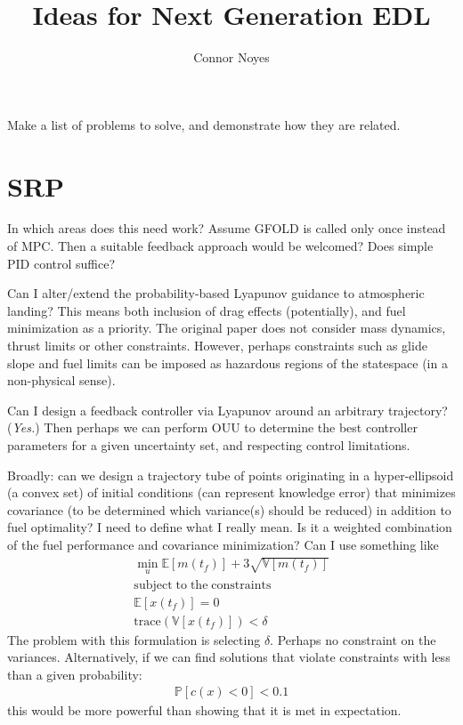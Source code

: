 \documentclass[10pt,a4paper]{article}
\author{Connor Noyes}
\title{Ideas for Next Generation EDL}
\begin{document}

	Make a list of problems to solve, and demonstrate how they are related.
	\section{SRP}
	In which areas does this need work? Assume GFOLD is called only once instead of MPC. Then a suitable feedback approach would be welcomed? Does simple PID control suffice?
	 
	Can I alter/extend the probability-based Lyapunov guidance to atmospheric landing? This means both inclusion of drag effects (potentially), and fuel minimization as a priority. The original paper does not consider mass dynamics, thrust limits or other constraints. However, perhaps constraints such as glide slope and fuel limits can be imposed as hazardous regions of the statespace (in a non-physical sense).
	
	Can I design a feedback controller via Lyapunov around an arbitrary trajectory? (\textit{Yes.}) Then perhaps we can perform OUU to determine the best controller parameters for a given uncertainty set, and respecting control limitations.
	
	Broadly: can we design a trajectory tube of points originating in a hyper-ellipsoid (a convex set) of initial conditions (can represent knowledge error) that minimizes covariance (to be determined which variance(s) should be reduced) in addition to fuel optimality? I need to define what I really mean. Is it a weighted combination of the fuel performance and covariance minimization? Can I use something like 
	\begin{align}
	\min_u \mathbb{E}[m(t_f)] + 3\sqrt{\mathbb{V}[m(t_f)]} \\
	\mathrm{subject\; to\; the\; constraints}\nonumber \\
	\mathbb{E}[x(t_f)] = 0 \\
	\mathrm{trace}(\mathbb{V}[x(t_f)]) < \delta
	\end{align}
	The problem with this formulation is selecting $\delta$. Perhaps no constraint on the variances. Alternatively, if we can find solutions that violate constraints with less than a given probability:
	\begin{align}
	\mathbb{P}[c(x)<0] < 0.1 
	\end{align}
	this would be more powerful than showing that it is met in expectation. 
	
\end{document}
